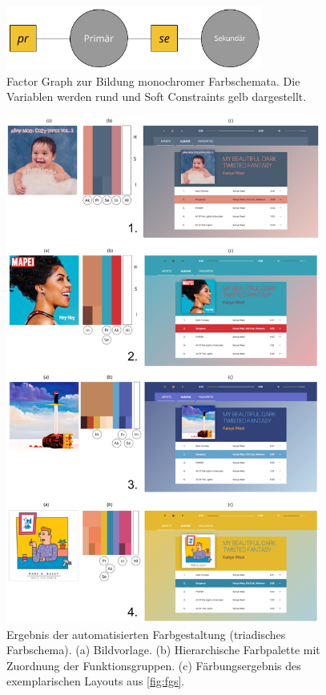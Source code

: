 \begin{figure}[h]
\centering
\includegraphics[width=0.75\textwidth]{img/scheme_monochrom.png}
\caption{Factor Graph zur Bildung monochromer Farbschemata. Die Variablen werden rund und Soft Constraints gelb dargestellt.}
\label{fig:scheme_monochrom}
\end{figure}

\begin{figure}[h]
\centering
\includegraphics[width=0.92\textwidth]{img/results_triadic.png}
\caption{Ergebnis der automatisierten Farbgestaltung (triadisches Farbschema). (a) Bildvorlage. (b) Hierarchische Farbpalette mit Zuordnung der Funktionsgruppen. (c) Färbungsergebnis des exemplarischen Layouts aus \autoref{fig:fgs}.}
\label{fig:results_triadic}
\end{figure}

